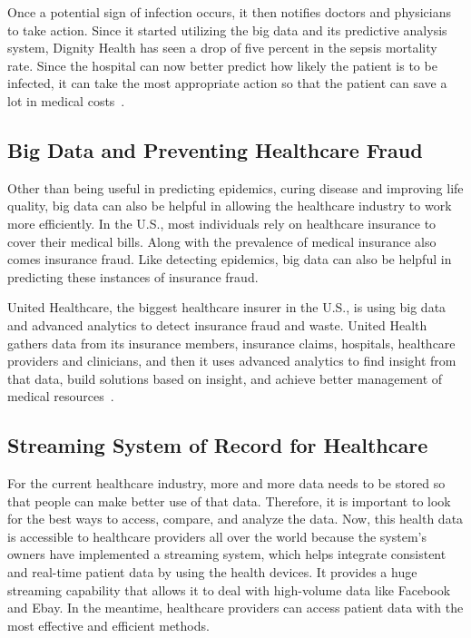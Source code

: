 Once a potential sign of infection occurs, it then 
notifies doctors and 
physicians to take action. 
Since it started utilizing the big data and its 
predictive analysis system, 
Dignity Health has seen a drop of five percent 
in the sepsis mortality rate. 
Since the hospital can now better predict how 
likely the 
patient is to be infected, it can take the most 
appropriate action so that the 
patient can save a lot in medical costs~\cite{sas}. 

\subsection{Big Data and Preventing Healthcare Fraud}
Other than being useful in predicting epidemics, 
curing disease and improving 
life quality, big data can also be helpful in allowing 
the healthcare industry to 
work more efficiently. In the U.S., 
most individuals rely on healthcare insurance to 
cover their medical bills. Along with the prevalence 
of medical insurance also 
comes insurance fraud. Like detecting epidemics, 
big data can also be 
helpful in predicting these instances of insurance 
fraud. 

United Healthcare, the biggest healthcare insurer in 
the U.S., is using big data 
and advanced analytics to detect insurance 
fraud and waste. United Health 
gathers data from its insurance members, 
insurance claims, hospitals, 
healthcare providers and clinicians, and then 
it uses advanced analytics to 
find insight from that data, build solutions 
based on insight, and achieve 
better management of medical resources~\cite{sas}. 

\subsection{Streaming System of Record for Healthcare}
For the current healthcare industry, more and 
more data needs to be stored so 
that people can make better use of that data. 
Therefore, it is important to look 
for the best ways to access, compare, and 
analyze the data. Now, 
this health data is accessible to healthcare 
providers all over 
the world because the system's owners have
implemented a streaming system, which helps 
integrate consistent and real-time 
patient data by using the health devices. 
It provides a huge streaming 
capability that allows it to deal with high-volume 
data like Facebook and Ebay. 
In the 
meantime, healthcare providers can access 
patient data with the most 
effective and efficient methods. 

